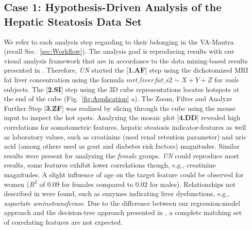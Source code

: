 \documentclass[journal]{style/vgtc} 			          %
\newcommand{\com}[1]{\textcolor{orange}{\uline{#1}}}
\begin{document}
\subsection{Case 1: Hypothesis-Driven Analysis of the Hepatic Steatosis Data Set}
We refer to each analysis step regarding to their belonging in the VA-Mantra (recall Sec.~\ref{sec:Workflow}).
The analysis goal is reproducing results with our visual analysis framework that are in accordance to the data mining-based results presented in \cite{Niemann2014}.
Therefore, \emph{UN} started the [\textbf{1.AF}] step using the dichotomized MRI fat liver concentration using the formula $mrt\_liverfat\_s2 \sim X + Y + Z$ for \emph{male} subjects.
The [\textbf{2.SI}] step using the 3D cube representations locates hotspots at the end of the cube (Fig.~\ref{fig:Application} a).
The Zoom, Filter and Analyze Further Step [\textbf{3.ZF}] was realized by slicing through the cube using the mouse input to inspect the hot spots.
Analyzing the mosaic plot [\textbf{4.DD}] revealed high correlations for somatometric features, hepatic steatosis indicator-features as well as laboratory values, such as creatinine (used renal retention parameter) and uric acid (among others used as gout and diabetes risk factors) magnitudes.
Similar results were present for analyzing the \emph{female} groups.
\emph{UN} could reproduce most results, some features exhibit lower correlations though, e.g., creatinine magnitudes.
A slight influence of age on the target feature could be observed for women ($R^2$ of $0.09$ for females compared to $0.02$ for males).
Relationships not described in \cite{Niemann2014} were found, such as enzymes indicating liver dysfunctions, e.g., \emph{aspartate aminotransferase}.
% 
Due to the difference between our regression-model approach and the decision-tree approach presented in \cite{Niemann2014}, a complete matching set of correlating features are not expected.
\end{document}
